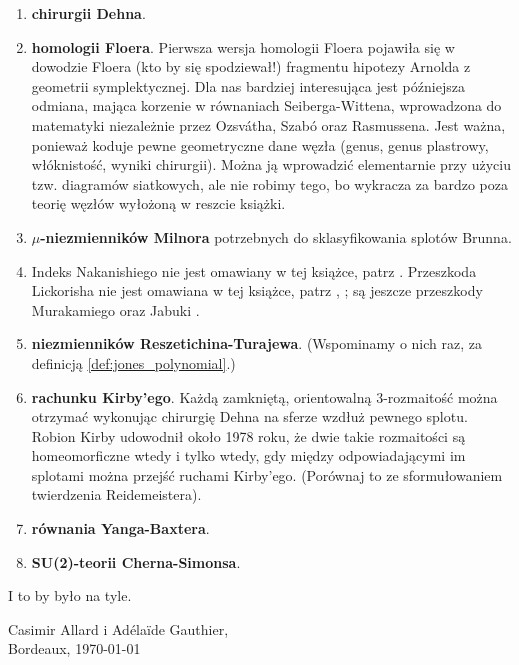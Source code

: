 \begin{enumerate}
    \item \textbf{chirurgii Dehna}.
    \item \textbf{homologii Floera}.
    Pierwsza wersja homologii Floera pojawiła się w dowodzie Floera (kto by się spodziewał!) fragmentu hipotezy Arnolda z geometrii symplektycznej.
    Dla nas bardziej interesująca jest późniejsza odmiana, mająca korzenie w równaniach Seiberga-Wittena, wprowadzona do matematyki niezależnie przez Ozsvátha, Szabó oraz Rasmussena.
    Jest ważna, ponieważ koduje pewne geometryczne dane węzła (genus, genus plastrowy, włóknistość, wyniki chirurgii).
    Można ją wprowadzić elementarnie przy użyciu tzw. diagramów siatkowych, ale nie robimy tego, bo wykracza za bardzo poza teorię węzłów wyłożoną w reszcie książki.
    \item \textbf{$\mu$-niezmienników Milnora} potrzebnych do sklasyfikowania splotów Brunna.
    \item Indeks Nakanishiego nie jest omawiany w tej książce, patrz \cite{nakanishi1981}.
    Przeszkoda Lickorisha nie jest omawiana w tej książce, patrz \cite{cochran1986}, \cite{lickorish1985}; są jeszcze przeszkody Murakamiego \cite{murakami1990} oraz Jabuki \cite{jabuka2010}.
    \item \textbf{niezmienników Reszetichina-Turajewa}.
    (Wspominamy o nich raz, za definicją \ref{def:jones_polynomial}.)
    \item \textbf{rachunku Kirby'ego}.
    Każdą zamkniętą, orientowalną 3-rozmaitość można otrzymać wykonując chirurgię Dehna na sferze wzdłuż pewnego splotu. Robion Kirby udowodnił około 1978 roku, że dwie takie rozmaitości są homeomorficzne wtedy i tylko wtedy, gdy między odpowiadającymi im splotami można przejść ruchami Kirby'ego.
    (Porównaj to ze sformułowaniem twierdzenia Reidemeistera).
    \item \textbf{równania Yanga-Baxtera}. 
    \item \textbf{SU(2)-teorii Cherna-Simonsa}.
\end{enumerate}
I to by było na tyle.
\begin{flushright}
    Casimir Allard i Adélaïde Gauthier,\\Bordeaux, \today
\end{flushright}

